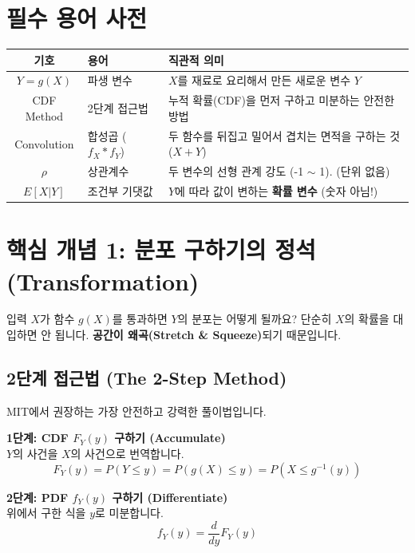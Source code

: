 \documentclass[11pt,a4paper]{book}
\theoremstyle{definition}
\begin{document}
\section{필수 용어 사전}

\begin{center}
\begin{tabular}{|c|l|l|}
\hline
\rowcolor{mainblue!20} \textbf{기호} & \textbf{용어} & \textbf{직관적 의미} \\ \hline
$Y=g(X)$ & 파생 변수 & $X$를 재료로 요리해서 만든 새로운 변수 $Y$ \\ \hline
CDF Method & 2단계 접근법 & 누적 확률(CDF)을 먼저 구하고 미분하는 안전한 방법 \\ \hline
Convolution & 합성곱 ($f_X * f_Y$) & 두 함수를 뒤집고 밀어서 겹치는 면적을 구하는 것 ($X+Y$) \\ \hline
$\rho$ & 상관계수 & 두 변수의 선형 관계 강도 (-1 $\sim$ 1). (단위 없음) \\ \hline
$E[X|Y]$ & 조건부 기댓값 & $Y$에 따라 값이 변하는 \textbf{확률 변수} (숫자 아님!) \\ \hline
\end{tabular}
\end{center}

\section{핵심 개념 1: 분포 구하기의 정석 (Transformation)}

입력 $X$가 함수 $g(X)$를 통과하면 $Y$의 분포는 어떻게 될까요? 단순히 $X$의 확률을 대입하면 안 됩니다. \textbf{공간이 왜곡(Stretch \& Squeeze)}되기 때문입니다.


\subsection{2단계 접근법 (The 2-Step Method)}
MIT에서 권장하는 가장 안전하고 강력한 풀이법입니다.

\begin{mathstep}[title={CDF 먼저 구하고 미분하라!}]
\textbf{1단계: CDF $F_Y(y)$ 구하기 (Accumulate)} \\
$Y$의 사건을 $X$의 사건으로 번역합니다.
\[ F_Y(y) = P(Y \le y) = P(g(X) \le y) = P(X \le g^{-1}(y)) \]

\textbf{2단계: PDF $f_Y(y)$ 구하기 (Differentiate)} \\
위에서 구한 식을 $y$로 미분합니다.
\[ f_Y(y) = \frac{d}{dy} F_Y(y) \]
\end{mathstep}
\end{document}
